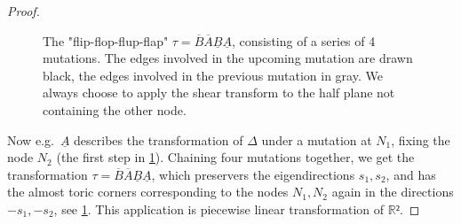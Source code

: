 \documentclass[12pt,a4paper,draft]{scrartcl}
\begin{document}
\begin{proof}
\begin{figure}
    \caption{The "flip-flop-flup-flap" $τ = \overline{B} \overline{A} \underline{B} \underline{A}$, consisting of a series of 4 mutations. The edges involved in the upcoming mutation are drawn black, the edges involved in the previous mutation in gray. We always choose to apply the shear transform to the half plane not containing the other node.}
    \label{fig:flip-flop-flup-flap}
  \end{figure}

  Now e.g.\ $\underline{A}$ describes the transformation of $Δ$ under a mutation at $N_1$, fixing the node $N_2$ (the first step in \cref{fig:flip-flop-flup-flap}).
  Chaining four mutations together, we get the transformation $τ = \overline{B} \overline{A} \underline{B} \underline{A}$, which preservers the eigendirections $s_1,s_2$, and has the almost toric corners corresponding to the nodes $N_1,N_2$ again in the directions $-s_1,-s_2$, see \cref{fig:flip-flop-flup-flap}.
  This application is piecewise linear transformation of $ℝ²$.


\end{proof}
\end{document}
